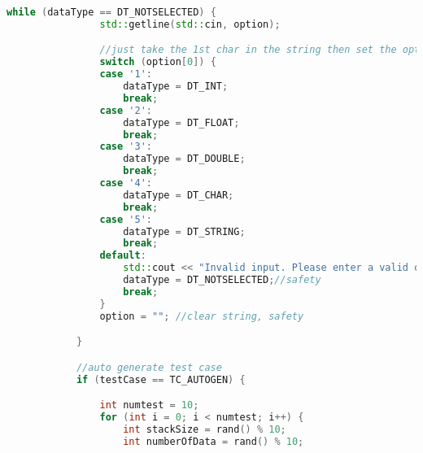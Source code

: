 \documentclass{report}
\begin{document}
\begin{lstlisting}[language=C++]
			while (dataType == DT_NOTSELECTED) {
				std::getline(std::cin, option);

				//just take the 1st char in the string then set the option
				switch (option[0]) {
				case '1':
					dataType = DT_INT;
					break;
				case '2':
					dataType = DT_FLOAT;
					break;
				case '3':
					dataType = DT_DOUBLE;
					break;
				case '4':
					dataType = DT_CHAR;
					break;
				case '5':
					dataType = DT_STRING;
					break;
				default:
					std::cout << "Invalid input. Please enter a valid option." << std::endl;
					dataType = DT_NOTSELECTED;//safety
					break;
				}
				option = ""; //clear string, safety

			}

			//auto generate test case
			if (testCase == TC_AUTOGEN) {

				int numtest = 10;
				for (int i = 0; i < numtest; i++) {
					int stackSize = rand() % 10;
					int numberOfData = rand() % 10;


\end{lstlisting}
\end{document}
